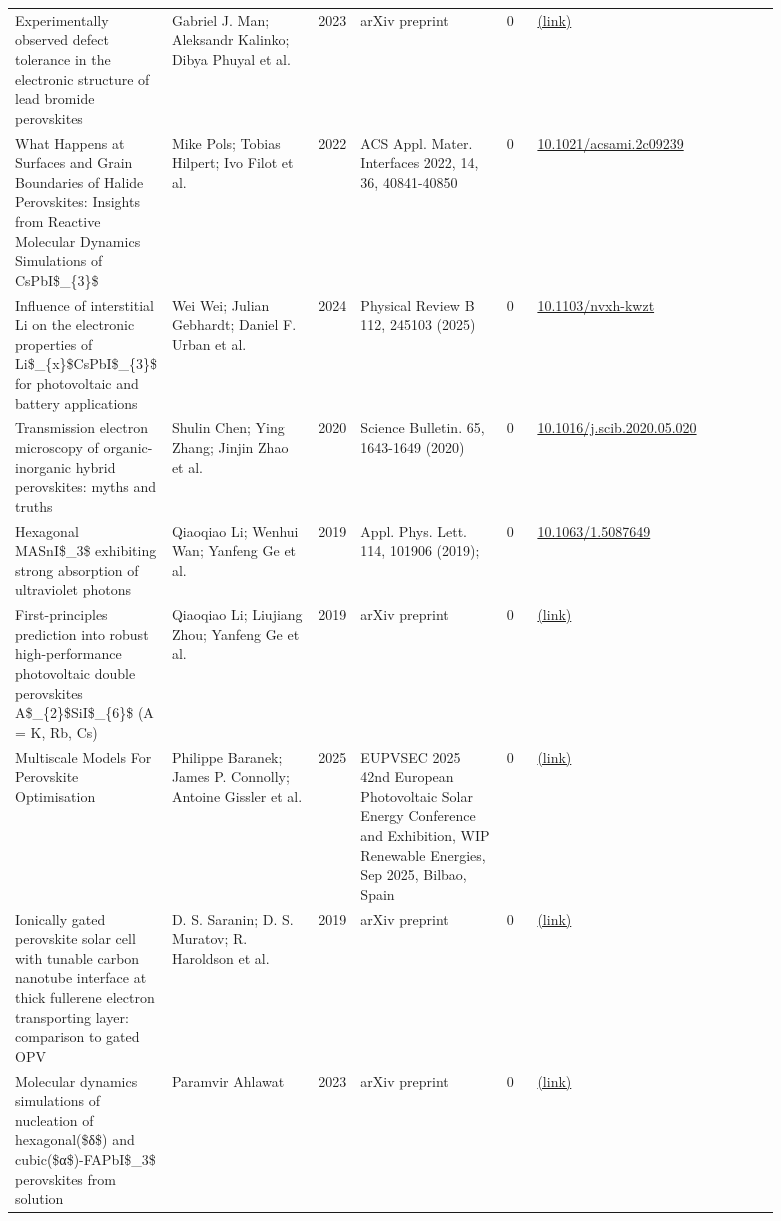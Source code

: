 \documentclass[10pt,a4paper]{article}
\begin{document}
{\begin{longtable}{p{0.197\linewidth}p{0.197\linewidth}p{0.043\linewidth}p{0.197\linewidth}p{0.043\linewidth}p{0.117\linewidth}p{0.098\linewidth}}
Experimentally observed defect tolerance in the electronic structure of lead bromide perovskites & Gabriel J. Man; Aleksandr Kalinko; Dibya Phuyal et al. & 2023 & arXiv preprint & 0 & \href{http://arxiv.org/abs/2305.04014v1}{(link)} &  \\
What Happens at Surfaces and Grain Boundaries of Halide Perovskites: Insights from Reactive Molecular Dynamics Simulations of CsPbI\$\_\{3\}\$ & Mike Pols; Tobias Hilpert; Ivo Filot et al. & 2022 & ACS Appl. Mater. Interfaces 2022, 14, 36, 40841-40850 & 0 & \href{https://doi.org/10.1021/acsami.2c09239}{10.1021/acsami.2c09239} &  \\
Influence of interstitial Li on the electronic properties of Li\$\_\{x\}\$CsPbI\$\_\{3\}\$ for photovoltaic and battery applications & Wei Wei; Julian Gebhardt; Daniel F. Urban et al. & 2024 & Physical Review B 112, 245103 (2025) & 0 & \href{https://doi.org/10.1103/nvxh-kwzt}{10.1103/nvxh-kwzt} &  \\
Transmission electron microscopy of organic-inorganic hybrid perovskites: myths and truths & Shulin Chen; Ying Zhang; Jinjin Zhao et al. & 2020 & Science Bulletin. 65, 1643-1649 (2020) & 0 & \href{https://doi.org/10.1016/j.scib.2020.05.020}{10.1016/j.scib.2020.05.020} &  \\
Hexagonal MASnI\$\_3\$ exhibiting strong absorption of ultraviolet photons & Qiaoqiao Li; Wenhui Wan; Yanfeng Ge et al. & 2019 & Appl. Phys. Lett. 114, 101906 (2019); & 0 & \href{https://doi.org/10.1063/1.5087649}{10.1063/1.5087649} &  \\
First-principles prediction into robust high-performance photovoltaic double perovskites A\$\_\{2\}\$SiI\$\_\{6\}\$ (A = K, Rb, Cs) & Qiaoqiao Li; Liujiang Zhou; Yanfeng Ge et al. & 2019 & arXiv preprint & 0 & \href{http://arxiv.org/abs/1908.02187v2}{(link)} &  \\
Multiscale Models For Perovskite Optimisation & Philippe Baranek; James P. Connolly; Antoine Gissler et al. & 2025 & EUPVSEC 2025 42nd European Photovoltaic Solar Energy Conference and Exhibition, WIP Renewable Energies, Sep 2025, Bilbao, Spain & 0 & \href{http://arxiv.org/abs/2510.14396v1}{(link)} &  \\
Ionically gated perovskite solar cell with tunable carbon nanotube interface at thick fullerene electron transporting layer: comparison to gated OPV & D. S. Saranin; D. S. Muratov; R. Haroldson et al. & 2019 & arXiv preprint & 0 & \href{http://arxiv.org/abs/1911.02619v1}{(link)} &  \\
Molecular dynamics simulations of nucleation of hexagonal(\$δ\$) and cubic(\$α\$)-FAPbI\$\_3\$ perovskites from solution & Paramvir Ahlawat & 2023 & arXiv preprint & 0 & \href{http://arxiv.org/abs/2306.14172v1}{(link)} &  \\

\end{longtable}}
\end{document}
